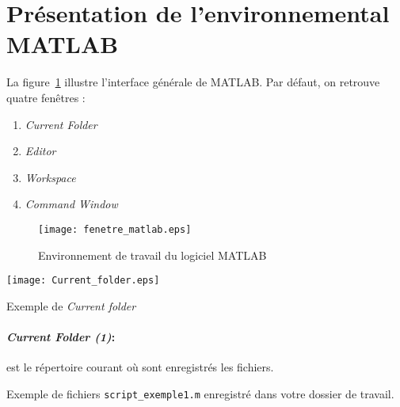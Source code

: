 \section{Présentation de l'environnemental MATLAB}
La figure~\ref{fig-envMATLAB} illustre l'interface générale de MATLAB. 
Par défaut, on retrouve quatre fenêtres :
\begin{enumerate}
    \item \emph{Current Folder}
    \item \emph{Editor}
    \item \emph{Workspace}
    \item \emph{Command Window}
\end{enumerate}
\begin{figure}[!h]
    \centering
    \texttt{[image: fenetre\_matlab.eps]}
    \caption{Environnement de travail du logiciel MATLAB \label{fig-envMATLAB}}    
\end{figure}
\clearpage
\begin{marginfigure}
    \centering
    \texttt{[image: Current\_folder.eps]}
    \caption{Exemple de \emph{Current folder}\label{fig-CF}}    
\end{marginfigure}
\paragraph{\emph{Current Folder (1)}: } est le répertoire courant où sont 
enregistrés les fichiers. 

Exemple de fichiers 
\texttt{script\_exemple1.m} enregistré dans votre dossier de travail.


